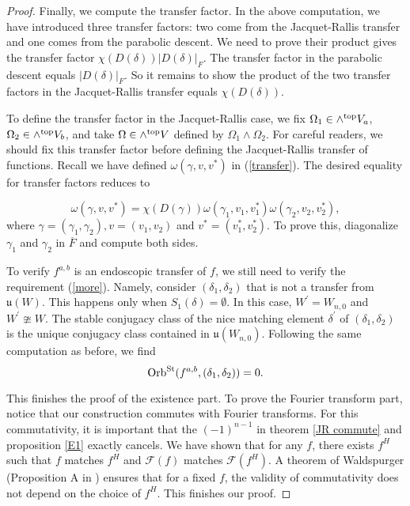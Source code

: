 \documentclass[11pt, oneside,reqno]{amsart}   	%
\begin{document}
\begin{proof}
Finally, we compute the transfer factor. In the above computation, we have introduced three transfer factors: two come from the Jacquet-Rallis transfer and one comes from the parabolic descent. We need to prove their product gives the transfer factor $\chi(D(\delta))|D(\delta)|_F$. The transfer factor in the parabolic descent equals $|D(\delta)|_F$. So it remains to show the product of the two transfer factors in the Jacquet-Rallis transfer equals  $\chi(D(\delta))$.

To define the transfer factor in the Jacquet-Rallis case, we fix $\Omega_1 \in \wedge^{\textup{top}}V_a$, $\Omega_2 \in \wedge^{\textup{top}}V_b$, and take $\Omega \in \wedge^{\textup{top}}V$ defined by $\Omega_1 \wedge \Omega_2$. For careful readers, we should fix this transfer factor before defining the Jacquet-Rallis transfer of functions.  Recall we have defined $\omega(\gamma, v, v^*)$ in  (\ref{transfer}). The desired equality for transfer factors reduces to

$$\omega(\gamma, v, v^*)=\chi(D(\gamma))\omega(\gamma_1, v_1, v_1^*)\omega(\gamma_2, v_2, v_2^*),$$
where $\gamma=(\gamma_1, \gamma_2), v=(v_1, v_2)$ and $v^*=(v^*_1, v^*_2)$. To prove this, diagonalize $\gamma_1$ and $\gamma_2$ in $\overline{F}$ and compute both sides.

To verify $f^{a,b}$ is an endoscopic transfer of $f$, we still need to verify the requirement (\ref{more}). Namely, consider $(\delta_1,\delta_2)$ that is not a transfer from $\mathfrak{u}(W)$. This happens only when $S_1(\delta)=\emptyset$. In this case, $W^\prime=W_{n,0}$ and $W^\prime \ncong W$. The stable conjugacy class of the nice matching element $\delta^\prime$ of $(\delta_1,\delta_2)$ is the unique conjugacy class contained in $\mathfrak{u}(W_{n,0})$. Following the same computation as before, we find $$\textup{Orb}^{\textup{St}}(f^{a,b},(\delta_1,\delta_2))=0.$$

This finishes the proof of the existence part. To prove the Fourier transform part, notice that our construction commutes with Fourier transforms. For this commutativity, it is important that the $(-1)^{n-1}$ in theorem \ref{JR commute} and proposition \ref{E1} exactly cancels. We have shown that for any $f$, there exists $f^H$ such that $f$ matches $f^H$ and $\mathcal{F}(f)$ matches  $\mathcal{F}(f^H)$. A theorem of Waldspurger (Proposition A in \cite{Wa3}) ensures that for a fixed $f$, the validity of commutativity does not depend on the choice of $f^H$. This finishes our proof. 
\end{proof}
\end{document}
